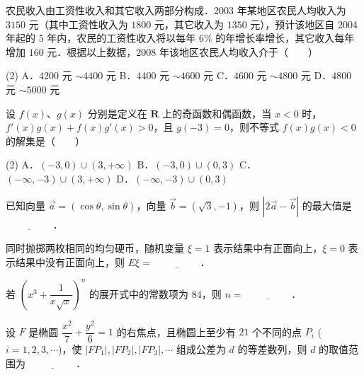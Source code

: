 \begin{question}
农民收入由工资性收入和其它收入两部分构成．2003 年某地区农民人均收入为 $3150$ 元（其中工资性收入为 $1800$ 元，其它收入为 $1350$ 元），预计该地区自 2004 年起的 $5$ 年内，农民的工资性收入将以每年 $6\%$ 的年增长率增长，其它收入每年增加 $160$ 元．根据以上数据，2008 年该地区农民人均收入介于\mbox{（　　）}

\begin{gkopts}(2)
\task A．$4200$ 元 $\sim 4400$ 元
\task B．$4400$ 元 $\sim 4600$ 元
\task C．$4600$ 元 $\sim 4800$ 元
\task D．$4800$ 元 $\sim 5000$ 元
\end{gkopts}

\end{question}
\begin{question}
设 $f(x)$、$g(x)$ 分别是定义在 $\mathbf{R}$ 上的奇函数和偶函数，当 $x < 0$ 时，$f'(x)g(x) + f(x)g'(x) > 0$，且 $g(-3) = 0$，则不等式 $f(x)g(x) < 0$ 的解集是\mbox{（　　）}

\begin{gkopts}(2)
\task A．$(-3, 0) \cup (3, +\infty)$
\task B．$(-3, 0) \cup (0, 3)$
\task C．$(-\infty, -3) \cup (3, +\infty)$
\task D．$(-\infty, -3) \cup (0, 3)$
\end{gkopts}

\end{question}

\begin{question}
已知向量 $\vec{a} = (\cos\theta, \sin\theta)$，向量 $\vec{b} = (\sqrt{3}, -1)$，则 $|2\vec{a} - \vec{b}|$ 的最大值是 $\underline{\hspace{2cm}}$．

\end{question}
\begin{question}
同时抛掷两枚相同的均匀硬币，随机变量 $\xi = 1$ 表示结果中有正面向上，$\xi = 0$ 表示结果中没有正面向上，则 $E\xi = \underline{\hspace{2cm}}$．

\end{question}
\begin{question}
若 $\left(x^3 + \dfrac{1}{x\sqrt{x}}\right)^n$ 的展开式中的常数项为 $84$，则 $n = \underline{\hspace{2cm}}$．

\end{question}
\begin{question}
设 $F$ 是椭圆 $\dfrac{x^2}{7} + \dfrac{y^2}{6} = 1$ 的右焦点，且椭圆上至少有 $21$ 个不同的点 $P_i$ ($i = 1, 2, 3, \cdots$)，使 $|FP_1|, |FP_2|, |FP_3|, \cdots$ 组成公差为 $d$ 的等差数列，则 $d$ 的取值范围为 $\underline{\hspace{2cm}}$．

\end{question}

